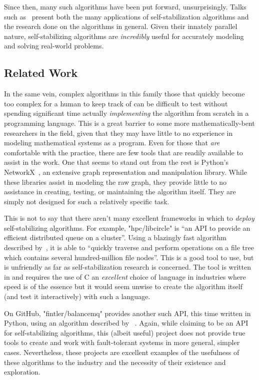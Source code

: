 Since then, many such algorithms have been put forward, unsurprisingly.
Talks such as~\autocite{dolev:talk} present both
  the many applications of self-stabilization algorithms and
  the research done on the algorithms in general.
Given their innately parallel nature,
  self-stabilizing algorithms are \emph{incredibly} useful
  for accurately modeling and solving real-world problems.

\subsection{Related Work}
\label{sec:introduction:related-work}
In the same vein, complex algorithms in this family
  \Dash those that quickly become too complex for a human to keep track of \Dash
  can be difficult to test without spending significant time
  actually \emph{implementing} the algorithm from scratch in a programming language.
This is a great barrier to some more mathematically-bent researchers in the field,
  given that they may have little to no experience in modeling mathematical systems as a program.
Even for those that \emph{are} comfortable with the practice,
  there are few tools that are readily available to assist in the work.
One that seems to stand out from the rest is Python's NetworkX~\autocite{hagberg:networkx},
  an extensive graph representation and manipulation library.
While these libraries assist in modeling the raw graph,
  they provide little to no assistance in creating, testing, or maintaining the algorithm itself.
They are simply not designed for such a relatively specific task.

This is not to say that there aren't many excellent frameworks in which
  to \emph{deploy} self-stabilizing algorithms.
For example, "hpc/libcircle" is \enquote{an API to provide an efficient distributed queue on a cluster}.
Using a blazingly fast algorithm described by~\autocite{lafon:balanceMQ},
  it is able to \enquote{quickly traverse and perform operations on a file tree
    which contains several hundred-million file nodes}.
This is a good tool to use, but is unfriendly as far as self-stabilization research is concerned.
The tool is written in and requires the use of C
  \Dash an \emph{excellent} choice of language in industries where speed is of the essence \Dash
  but it would seem unwise to create the algorithm itself
  (and test it interactively) with such a language.

On GitHub, "fintler/balancemq" provides another such API, this time written in Python,
  using an algorithm described by \citeauthor{lafon:balanceMQ}~\autocite{lafon:balanceMQ}.
Again, while claiming to be an API for self-stabilizing algorithms,
  this (albeit useful) project does not provide true tools to create and work with
  fault-tolerant systems in more general, simpler cases.
Nevertheless, these projects are excellent examples of the
  usefulness of these algorithms to the industry and
  the necessity of their existence and exploration.

